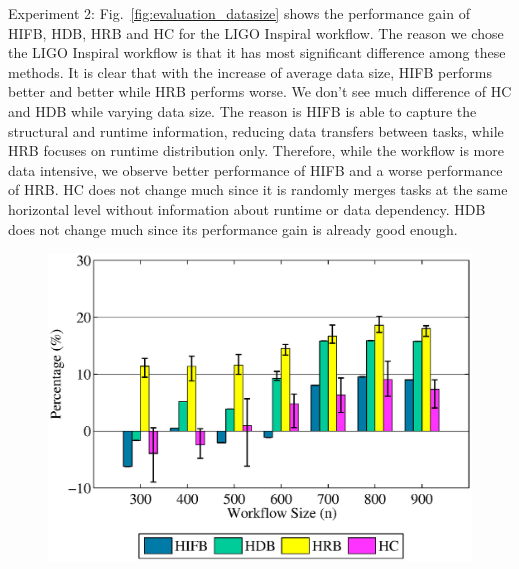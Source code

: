 Experiment 2: Fig.~\ref{fig:evaluation_datasize} shows the performance gain of HIFB, HDB, HRB and HC for the LIGO Inspiral workflow. The reason we chose the LIGO Inspiral workflow is that it has most significant difference among these methods. It is clear that with the increase of average data size, HIFB performs better and better while HRB performs worse. We don't see much difference of HC and HDB while varying data size. The reason is HIFB is able to capture the structural and runtime information, reducing data transfers between tasks, while HRB focuses on runtime distribution only. Therefore, while the workflow is more data intensive, we observe better performance of HIFB and a worse performance of HRB. HC does not change much since it is randomly merges tasks at the same horizontal level without information about runtime or data dependency. HDB does not change much since its performance gain is already good enough. 


\begin{figure}[!htb]
	\centering
	\includegraphics[width=1.0\linewidth]{figures/evaluation/workflowsize.eps}
	\label{fig:evaluation_wfsize}
\end{figure}

